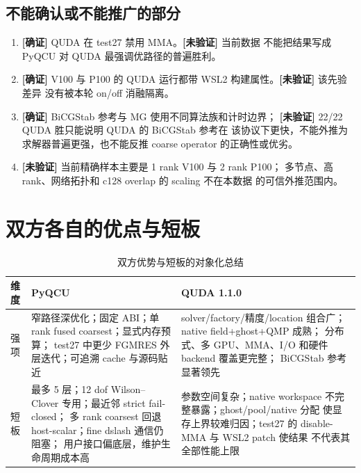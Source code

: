 \documentclass[UTF8,a4paper,11pt]{ctexart}
\newcommand{\code}[1]{\texttt{\detokenize{#1}}}
\newcommand{\confirmed}{\textcolor{evidencegreen}{\textbf{[确证]}}}
\newcommand{\unverified}{\textcolor{qudared}{\textbf{[未验证]}}}
\begin{document}
\subsection{不能确认或不能推广的部分}

\begin{enumerate}[leftmargin=2em]
  \item \confirmed{} QUDA 在 test27 禁用 MMA。\unverified{} 当前数据
        不能把结果写成 PyQCU 对 QUDA 最强调优路径的普遍胜利。
  \item \confirmed{} V100 与 P100 的 QUDA 运行都带 WSL2
        \code{DEV87_REDUCE_SYNC} 构建属性。\unverified{} 该先验差异
        没有被本轮 on/off 消融隔离。
  \item \confirmed{} BiCGStab 参考与 MG 使用不同算法族和计时边界；
        \unverified{} 22/22 QUDA 胜只能说明 QUDA 的 BiCGStab 参考在
        该协议下更快，不能外推为求解器普遍更强，也不能反推 coarse
        operator 的正确性或优劣。
  \item \unverified{} 当前精确样本主要是 1 rank V100 与 2 rank P100；
        多节点、高 rank、网络拓扑和 c128 overlap 的 scaling 不在本数据
        的可信外推范围内。
\end{enumerate}

\section{双方各自的优点与短板}

\begin{table}[htbp]
\centering
\caption{双方优势与短板的对象化总结}
\small
\begin{tabularx}{\textwidth}{@{}L{0.19\textwidth}Y Y@{}}
\toprule
维度 & PyQCU & QUDA 1.1.0 \\
\midrule
强项 &
窄路径深优化；固定 ABI；单 rank fused coarsest；显式内存预算；
test27 中更少 FGMRES 外层迭代；可追溯 cache 与源码贴近 &
solver/factory/精度/location 组合广；native field+ghost+QMP 成熟；
分布式、多 GPU、MMA、I/O 和硬件 backend 覆盖更完整；
BiCGStab 参考显著领先 \\
\midrule
短板 &
最多 5 层；12 dof Wilson--Clover 专用；最近邻 strict fail-closed；
多 rank coarsest 回退 host-scalar；fine dslash 通信仍阻塞；
用户接口偏底层，维护生命周期成本高 &
参数空间复杂；native workspace 不完整暴露；ghost/pool/native 分配
使显存上界较难归因；test27 的 disable-MMA 与 WSL2 patch 使结果
不代表其全部性能上限 \\
\bottomrule
\end{tabularx}
\end{table}
\end{document}
